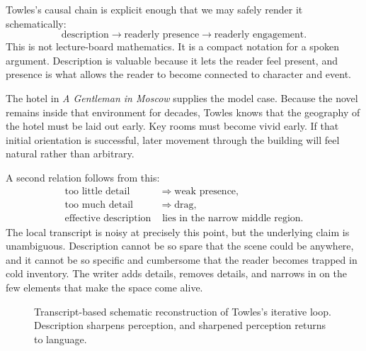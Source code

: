 Towles's causal chain is explicit enough that we may safely render it schematically:
\begin{equation}
\text{description} \longrightarrow \text{readerly presence} \longrightarrow \text{readerly engagement}.
\end{equation}
This is not lecture-board mathematics. It is a compact notation for a spoken argument. Description is valuable because it lets the reader feel present, and presence is what allows the reader to become connected to character and event.

The hotel in \emph{A Gentleman in Moscow} supplies the model case. Because the novel remains inside that environment for decades, Towles knows that the geography of the hotel must be laid out early. Key rooms must become vivid early. If that initial orientation is successful, later movement through the building will feel natural rather than arbitrary.

A second relation follows from this:
\begin{align}
\text{too little detail} &\Rightarrow \text{weak presence}, \\
\text{too much detail} &\Rightarrow \text{drag}, \\
\text{effective description} &\text{ lies in the narrow middle region.}
\end{align}
The local transcript is noisy at precisely this point, but the underlying claim is unambiguous. Description cannot be so spare that the scene could be anywhere, and it cannot be so specific and cumbersome that the reader becomes trapped in cold inventory. The writer adds details, removes details, and narrows in on the few elements that make the space come alive.

\begin{figure}[h]
\centering
{}
\caption{Transcript-based schematic reconstruction of Towles's iterative loop. Description sharpens perception, and sharpened perception returns to language.}
\end{figure}

